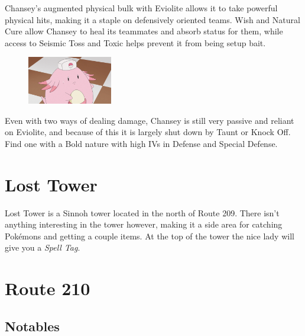 \documentclass[11pt]{article}
\begin{document}
\begin{mdframed}[style=MyFrame,nobreak=true,frametitle={Pokemon Spotlight: Chansey}]

Chansey's augmented physical bulk with Eviolite allows it to take powerful physical hits,
making it a staple on defensively oriented teams.
Wish and Natural Cure allow Chansey to heal its teammates and absorb status for them,
while access to Seismic Toss and Toxic helps prevent it from being setup bait.

\begin{figure}
\includegraphics[width=0.33\textwidth]{walkthrough/Sinnoh/spotlight-chansey}
\label{fig:spotlight-chansey}
\end{figure}

Even with two ways of dealing damage, Chansey is still very passive and reliant on
Eviolite, and because of this it is largely shut down by Taunt or Knock Off.
Find one with a Bold nature with high IVs in Defense and Special Defense.

\end{mdframed}

\section{Lost Tower}\label{sec:Lost_Tower}

Lost Tower is a Sinnoh tower located in the north of Route 209.
There isn’t anything interesting in the tower however,
making it a side area for catching Pokémons and getting a couple items.
At the top of the tower the nice lady will give you a \emph{Spell Tag}.






\section{Route 210}\label{sec:Route_210}

\subsection{Notables}\label{subsec:notables-route-210}
\end{document}
